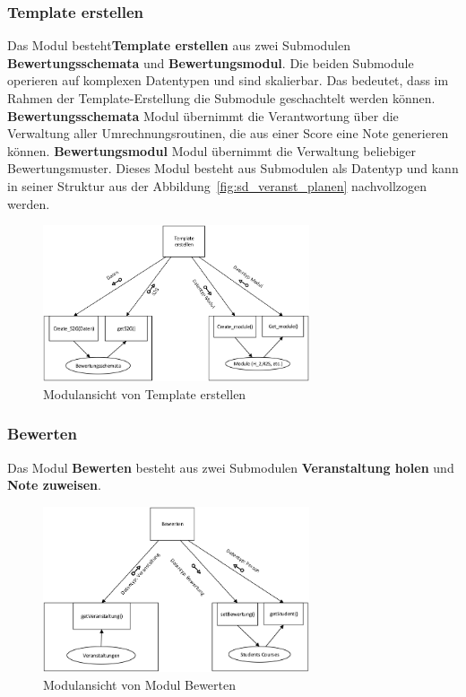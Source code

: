 \begin{appendix}
	\subsubsection{Template erstellen \label{sec:Template}}
		  Das Modul  besteht\textbf{Template erstellen} aus zwei Submodulen \textbf{Bewertungsschemata} und \textbf{Bewertungsmodul}. Die beiden Submodule operieren auf komplexen Datentypen und sind skalierbar. Das bedeutet, dass im Rahmen der Template-Erstellung die Submodule geschachtelt werden können.\\
		\textbf{Bewertungsschemata} Modul übernimmt die Verantwortung über die Verwaltung aller Umrechnungsroutinen, die aus einer Score eine Note generieren können.	
		\textbf{Bewertungsmodul} Modul übernimmt die Verwaltung beliebiger Bewertungsmuster. Dieses Modul 	besteht aus Submodulen als Datentyp und kann in seiner Struktur aus der Abbildung~\ref{fig:sd_veranst_planen} nachvollzogen werden.
		\begin{figure}[H]
			\centering
			\includegraphics[width=0.7\textwidth]{./img/MD_VeranstaltungPlanen}
			\caption{Modulansicht von Template erstellen}
			\label{fig:md_template_erstellen}
		\end{figure}
		
	\subsubsection{Bewerten}
		Das Modul \textbf{Bewerten} besteht aus zwei Submodulen \textbf{Veranstaltung holen} und \textbf{Note zuweisen}.
				
		\begin{figure}[H]
			\centering
			\includegraphics[width=0.7\textwidth]{./img/MD_bewerten}
			\caption{Modulansicht von Modul Bewerten}
			\label{fig:md_bewerten}
		\end{figure}
		

\end{appendix}
